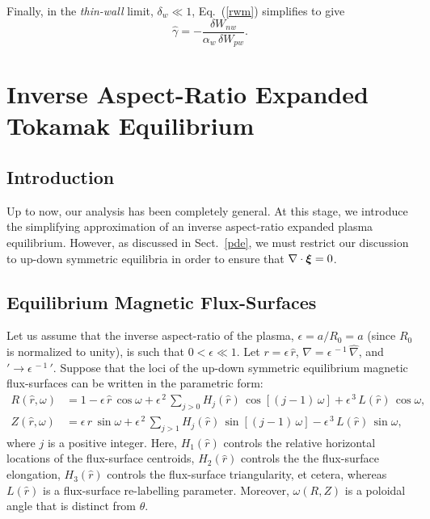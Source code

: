 \documentclass[12pt,prb,aps]{revtex4-1}
\newcommand {\bxi}{\mbox{\boldmath$\xi$}}
\begin{document}
Finally, in the {\em thin-wall}\/ limit, $\delta_w\ll 1$, Eq.~(\ref{rwm}) simplifies to give 
 \begin{equation}\label{rwm1}
 \hat{\gamma}= -\frac{\delta W_{nw}}{\alpha_w\,\delta W_{pw}}.
 \end{equation}

\section{Inverse Aspect-Ratio Expanded Tokamak Equilibrium}\label{large}

\subsection{Introduction}
Up to now, our analysis has been completely general. At this stage, we introduce the simplifying approximation of an  inverse aspect-ratio expanded plasma equilibrium. 
However, as discussed in Sect.~\ref{pde}, we must restrict our discussion to up-down symmetric equilibria in order to ensure that $\nabla\cdot\bxi=0$. 

\subsection{Equilibrium Magnetic Flux-Surfaces}\label{flux}
Let us assume that the inverse aspect-ratio of the plasma, $\epsilon=a/R_0=a$ (since $R_0$ is normalized to unity), is such that $0<\epsilon\ll 1$.  
Let $r=\epsilon\,\hat{r}$, $\nabla =\epsilon^{\,-1}\,\hat{\nabla}$, and $'\rightarrow \epsilon^{\,-1}\,'$. 
Suppose that the loci of the up-down symmetric equilibrium magnetic flux-surfaces can be written in the parametric form:\,\cite{tj,tj1,connor}
\begin{align}
R(\hat{r},\omega) &= 1 -\epsilon\,\hat{r}\,\cos\omega + \epsilon^{\,2}\,\sum_{j>0}H_j(\hat{r})\,\cos[(j-1)\,\omega] +\epsilon^{\,3}\,L(\hat{r})\,\cos\omega,\label{e19x}\\[0.5ex]
Z(\hat{r},\omega)&= \epsilon\,\hat{r}\,\sin\omega +\epsilon^{\,2}\,\sum_{j>1}H_j(\hat{r})\,\sin[(j-1)\,\omega]-\epsilon^{\,3}\,L(\hat{r})\,\sin\omega,\label{e20x}
\end{align}
where $j$ is a positive integer. 
Here, $H_1(\hat{r})$  controls the relative horizontal locations of the flux-surface centroids, $H_2(\hat{r})$ controls the 
the flux-surface elongation, $H_3(\hat{r})$  controls the flux-surface triangularity, et cetera, whereas $L(\hat{r})$ is a
flux-surface re-labelling parameter. Moreover, $\omega(R,Z)$ is a  poloidal angle that is distinct from $\theta$. 
\end{document}

